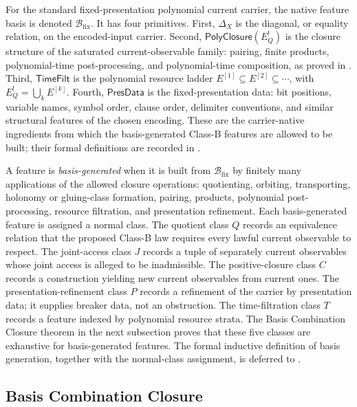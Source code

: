 \documentclass[11pt]{article}
\newcommand{\EQbang}{E^{!}_{Q}}
\theoremstyle{definition}
\begin{document}
For the standard fixed-presentation polynomial current carrier, the
native feature basis is denoted \(\mathcal B_{\mathrm{fix}}\).  It has
four primitives.  First, \(\Delta_{X}\) is the diagonal, or equality
relation, on the encoded-input carrier.  Second,
\(\mathsf{PolyClosure}(\EQbang)\) is the closure structure of the
saturated current-observable family: pairing, finite products,
polynomial-time post-processing, and polynomial-time composition, as
proved in .  Third,
\(\mathsf{TimeFilt}\) is the polynomial resource ladder
\(E^{[1]}\subseteq E^{[2]}\subseteq\cdots\), with
\(\EQbang=\bigcup_{k}E^{[k]}\).  Fourth,
\(\mathsf{PresData}\) is the fixed-presentation data: bit positions,
variable names, symbol order, clause order, delimiter conventions, and
similar structural features of the chosen encoding.  These are the
carrier-native ingredients from which the basis-generated Class-B
features are allowed to be built; their formal definitions are recorded
in .

A feature is \emph{basis-generated} when it is built from
\(\mathcal B_{\mathrm{fix}}\) by finitely many applications of the
allowed closure operations: quotienting, orbiting, transporting,
holonomy or gluing-class formation, pairing, products, polynomial
post-processing, resource filtration, and presentation refinement.  Each
basis-generated feature is assigned a normal class.  The quotient class
\(Q\) records an equivalence relation that the proposed Class-B law
requires every lawful current observable to respect.  The joint-access
class \(J\) records a tuple of separately current observables whose
joint access is alleged to be inadmissible.  The positive-closure class
\(C\) records a construction yielding new current observables from
current ones.  The presentation-refinement class \(P\) records a
refinement of the carrier by presentation data; it supplies breaker
data, not an obstruction.  The time-filtration class \(T\) records a
feature indexed by polynomial resource strata.  The Basis Combination
Closure theorem in the next subsection proves that these five classes
are exhaustive for basis-generated features.  The formal inductive
definition of basis generation, together with the normal-class
assignment, is deferred to .

\subsection{Basis Combination Closure}
\label{subsec:class-b:combination-closure}
\end{document}
